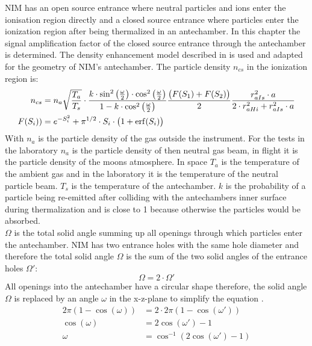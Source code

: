 		NIM has an open source entrance where neutral particles and ions enter the ionisation region directly and a closed source entrance where particles enter the ionization region after being thermalized in an antechamber. In this chapter the signal amplification factor of the closed source entrance through the antechamber is determined. The density enhancement model described in \cite{DensEnhan_Wurz_07} is used and adapted for the geometry of NIM's antechamber. The particle density $n_{cs}$ in the ionization region is:
		\begin{align}
			n_{cs} &= n_a\sqrt{\frac{T_a}{T_s}}\cdot\frac{k\cdot \sin^2\big(\frac{\omega}{2}\big)\cdot \cos^2\big(\frac{\omega}{2}\big)}{1-k\cdot \cos^2\big(\frac{\omega}{2}\big)}\frac{\big(F(S_1)+ F(S_2)\big)}{2} \frac{r_{aIs}^2\cdot a}{2\cdot r_{aHi}^2 + r_{aIs}^2\cdot a} \label{eq:thDensEnhan}\\
			F(S_i)) &= e^{-S_i^2} + \pi^{1/2}\cdot S_i\cdot\big(1 + {\rm erf}(S_i)\big) \label{eq:F(S)}
		\end{align}
		With $n_a$ is the particle density of the gas outside the instrument. For the tests in the laboratory $n_a$ is the particle density of then neutral gas beam, in flight it is the particle density of the moons atmosphere. In space $T_a$ is the temperature of the ambient gas and in the laboratory it is the temperature of the neutral particle beam. $T_s$ is the temperature of the antechamber. $k$ is the probability of a particle being re-emitted after colliding with the antechambers inner surface during thermalization and is close to 1 because otherwise the particles would be absorbed.\\
		$\Omega$ is the total solid angle summing up all openings through which particles enter the antechamber. NIM has two entrance holes with the same hole diameter and therefore the total solid angle $\Omega$ is the sum of the two solid angles of the entrance holes $\Omega'$:
		\begin{equation}
			\Omega = 2\cdot\Omega'
		\end{equation}
		All openings into the antechamber have a circular shape therefore, the solid angle $\Omega$ is replaced by an angle $\omega$ in the x-z-plane to simplify the equation \cite{Hedin_1964}. 
		\begin{align}
			2\pi(1- \cos(\omega)) &= 2\cdot 2\pi(1- \cos(\omega'))\\
			\cos(\omega) &= 2\cos(\omega') -1\\
			\omega &= \cos^{-1}(2\cos(\omega') -1)
		\end{align}
